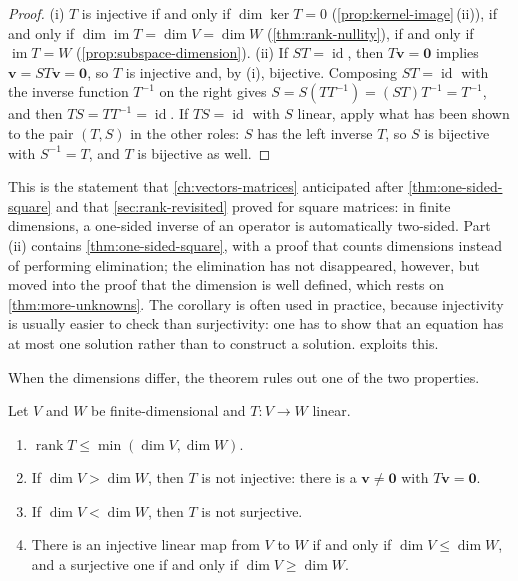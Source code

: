 \begin{proof}
(i) $T$ is injective if and only if $\dim\ker T=0$ (\cref{prop:kernel-image}\,(ii)), if and only if $\dim\operatorname{im}T=\dim V=\dim W$ (\cref{thm:rank-nullity}), if and only if $\operatorname{im}T=W$ (\cref{prop:subspace-dimension}). (ii) If $ST=\operatorname{id}$, then $T\mathbf v=\mathbf 0$ implies $\mathbf v=ST\mathbf v=\mathbf 0$, so $T$ is injective and, by (i), bijective. Composing $ST=\operatorname{id}$ with the inverse function $T^{-1}$ on the right gives $S=S(TT^{-1})=(ST)T^{-1}=T^{-1}$, and then $TS=TT^{-1}=\operatorname{id}$. If $TS=\operatorname{id}$ with $S$ linear, apply what has been shown to the pair $(T,S)$ in the other roles: $S$ has the left inverse $T$, so $S$ is bijective with $S^{-1}=T$, and $T$ is bijective as well.
\end{proof}

This is the statement that \cref{ch:vectors-matrices} anticipated after \cref{thm:one-sided-square} and that \cref{sec:rank-revisited} proved for square matrices: in finite dimensions, a one-sided inverse of an operator is automatically two-sided. Part (ii) contains \cref{thm:one-sided-square}, with a proof that counts dimensions instead of performing elimination; the elimination has not disappeared, however, but moved into the proof that the dimension is well defined, which rests on \cref{thm:more-unknowns}. The corollary is often used in practice, because injectivity is usually easier to check than surjectivity: one has to show that an equation has at most one solution rather than to construct a solution.  exploits this.

When the dimensions differ, the theorem rules out one of the two properties.

\begin{corollary}
\label{cor:dimension-inequalities}
Let $V$ and $W$ be finite-dimensional and $T\colon V\to W$ linear.
\begin{enumerate}
\item $\operatorname{rank}T\le\min(\dim V,\dim W)$.
\item If $\dim V>\dim W$, then $T$ is not injective: there is a $\mathbf v\ne\mathbf 0$ with $T\mathbf v=\mathbf 0$.
\item If $\dim V<\dim W$, then $T$ is not surjective.
\item There is an injective linear map from $V$ to $W$ if and only if $\dim V\le\dim W$, and a surjective one if and only if $\dim V\ge\dim W$.
\end{enumerate}
\end{corollary}

